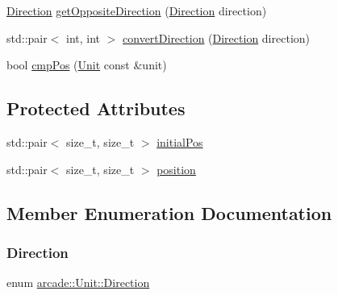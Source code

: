 \begin{DoxyCompactItemize}
\item 
\hyperlink{classarcade_1_1_unit_af418afeaba1f7fd5934b6ae1343215dd}{Direction} \hyperlink{classarcade_1_1_unit_aa1a289e46e53c2c9bf7d80ef5571d08f}{get\+Opposite\+Direction} (\hyperlink{classarcade_1_1_unit_af418afeaba1f7fd5934b6ae1343215dd}{Direction} direction)
\item 
std\+::pair$<$ int, int $>$ \hyperlink{classarcade_1_1_unit_ada89038fcb7152ea19e2639e1bbc58ea}{convert\+Direction} (\hyperlink{classarcade_1_1_unit_af418afeaba1f7fd5934b6ae1343215dd}{Direction} direction)
\item 
bool \hyperlink{classarcade_1_1_unit_ab79c51d02d31cc6578cc25b202e4292d}{cmp\+Pos} (\hyperlink{classarcade_1_1_unit}{Unit} const \&unit)
\end{DoxyCompactItemize}
\subsection*{Protected Attributes}
\begin{DoxyCompactItemize}
\item 
std\+::pair$<$ size\+\_\+t, size\+\_\+t $>$ \hyperlink{classarcade_1_1_unit_ac9e7559836ec4e3b3bdcde00d3e3bb97}{initial\+Pos}
\item 
std\+::pair$<$ size\+\_\+t, size\+\_\+t $>$ \hyperlink{classarcade_1_1_unit_ab56f7df422277f97e7738cb4807fd62d}{position}
\end{DoxyCompactItemize}


\subsection{Member Enumeration Documentation}
\mbox{\label{classarcade_1_1_unit_af418afeaba1f7fd5934b6ae1343215dd}} 
\subsubsection{\texorpdfstring{Direction}{Direction}}
{\footnotesize\ttfamily enum \hyperlink{classarcade_1_1_unit_af418afeaba1f7fd5934b6ae1343215dd}{arcade\+::\+Unit\+::\+Direction}}

